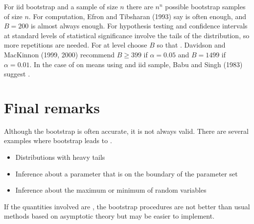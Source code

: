 For iid bootstrap and a sample of size $n$ there are $n^n$ possible bootstrap samples of size $n$.
For  computation, Efron and Tibsharan (1993) say  is often enough, and $B=200$ is almost always enough.
For hypothesis testing and confidence intervals at standard levels of statistical significance involve the tails of the distribution, 
so more repetitions are needed. 
For  at level choose $B$ so that . Davidson and MacKinnon (1999, 2000) recommend $B\geq 399$ if $\alpha=0.05$ and $B=1499$ if $\alpha=0.01$.
In the case of  on means using  and iid sample, Babu and Singh (1983) suggest .

\section{Final remarks}

Although the bootstrap is often accurate, it is not always valid.
There are several examples where bootstrap leads to .
\begin{Example}
    \begin{itemize}
        \item Distributions with heavy tails
        \item Inference about a parameter that is on the boundary of the parameter set
        \Info{$\to$ inference on $\sigma^2 in [0,\infty)$}
        \item Inference about the maximum or minimum of random variables
    \end{itemize}
\end{Example}
If the quantities involved are , the bootstrap procedures are not better than usual methods based on asymptotic theory but may be easier to implement.

